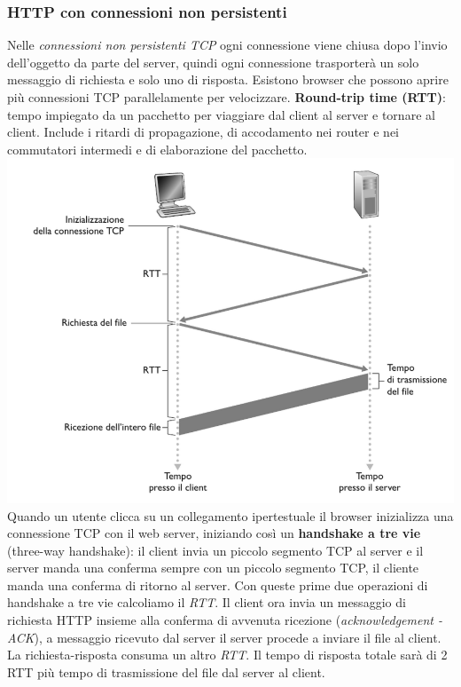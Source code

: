 \subsubsection*{HTTP con connessioni non persistenti}
Nelle \textit{connessioni non persistenti TCP} ogni connessione viene chiusa dopo l'invio dell'oggetto da parte del server, quindi ogni connessione trasporterà un solo messaggio di richiesta e solo uno di risposta.
Esistono browser che possono aprire più connessioni TCP parallelamente per velocizzare. \newline
\textbf{Round-trip time (RTT)}: tempo impiegato da un pacchetto per viaggiare dal client al server e tornare al client. Include i ritardi di propagazione, di accodamento nei router e nei commutatori intermedi e di elaborazione del pacchetto.
\includegraphics[width=\textwidth]{./img/rtt.png}
Quando un utente clicca su un collegamento ipertestuale il browser inizializza una connessione TCP con il web server, iniziando così un \textbf{handshake a tre vie} (three-way handshake): il client invia un piccolo segmento TCP al server e il server manda una conferma sempre con un piccolo segmento TCP, il cliente manda una conferma di ritorno al server.
Con queste prime due operazioni di handshake a tre vie calcoliamo il \textit{RTT}.\newline
Il client ora invia un messaggio di richiesta HTTP insieme alla conferma di avvenuta ricezione (\textit{acknowledgement - ACK}), a messaggio ricevuto dal server il server procede a inviare il file al client. La richiesta-risposta consuma un altro \textit{RTT}.
Il tempo di risposta totale sarà di 2 RTT più tempo di trasmissione del file dal server al client.

